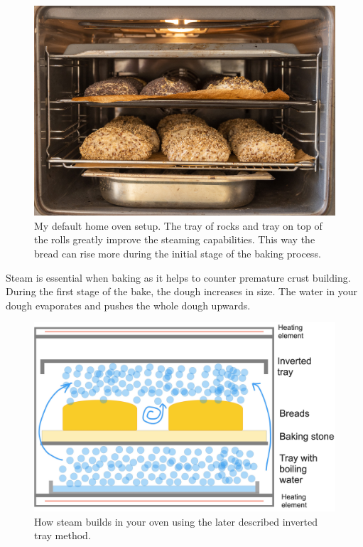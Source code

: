 \begin{figure}[!htb]
  \includegraphics[width=\textwidth]{oven-example}
  \caption[Home oven baking example to maximize steam]{My default home oven setup. The tray of rocks
  and tray on top of the rolls greatly improve the steaming capabilities. This way the bread can
  rise more during the initial stage of the baking process.}
\end{figure}

Steam is essential when baking as it helps to counter premature
crust building. During the first stage of the bake, the dough
increases in size. The water in your dough evaporates and pushes
the whole dough upwards.

\begin{figure}[!htb]
  \includegraphics[width=\textwidth]{baking-process-steam.jpg}
  \caption[Steam building with inverted tray]{How steam builds in your oven
      using the later described inverted tray method.}
\end{figure}

